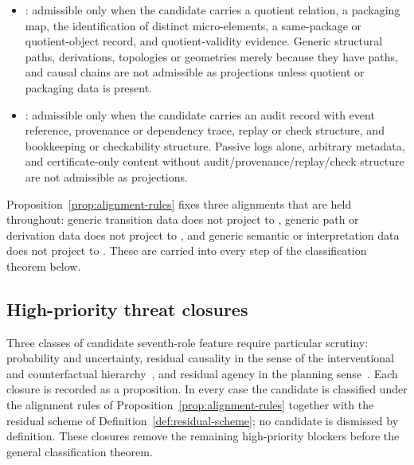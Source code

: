 \begin{proposition}
\begin{itemize}[topsep=2pt,itemsep=1pt]
    order, transition, refinement, staged-dynamics, or regime-ordering
    record with laws beyond bare labels. Bare labels, arbitrary
    relations without order, transition, or refinement law, quotient
    packaging, and audit bookkeeping are not admissible as \Pfour{}
    projections.
  \item \Pfive{}: admissible only when the candidate carries a quotient
    relation, a packaging map, the identification of distinct
    micro-elements, a same-package or quotient-object record, and
    quotient-validity evidence. Generic structural paths, derivations,
    topologies or geometries merely because they have paths, and causal
    chains are not admissible as \Pfive{} projections unless quotient
    or packaging data is present.
  \item \Psix{}: admissible only when the candidate carries an audit
    record with event reference, provenance or dependency trace, replay
    or check structure, and bookkeeping or checkability structure.
    Passive logs alone, arbitrary metadata, and certificate-only
    content without audit/provenance/replay/check structure are not
    admissible as \Psix{} projections.
\end{itemize}
\end{proposition}

\begin{remark}\label{rem:three-repaired-alignments}
Proposition~\ref{prop:alignment-rules} fixes three alignments that
are held throughout: generic transition data does not project to
\Pthree{}, generic path or derivation data does not project to
\Pfive{}, and generic semantic or interpretation data does not project
to \Pone{}. These are carried into every step of the classification
theorem below.
\end{remark}

\subsection{High-priority threat closures}\label{subsec:threat-closures}

Three classes of candidate seventh-role feature require particular
scrutiny: probability and uncertainty, residual causality in the
sense of the interventional and counterfactual
hierarchy~\citep{Pearl2009}, and residual agency in the planning
sense~\citep{Bratman1987}. Each closure is recorded as a proposition.
In every case the candidate is classified under the alignment rules
of Proposition~\ref{prop:alignment-rules} together with the residual
scheme of Definition~\ref{def:residual-scheme}; no candidate is
dismissed by definition. These closures remove the remaining
high-priority blockers before the general classification theorem.

